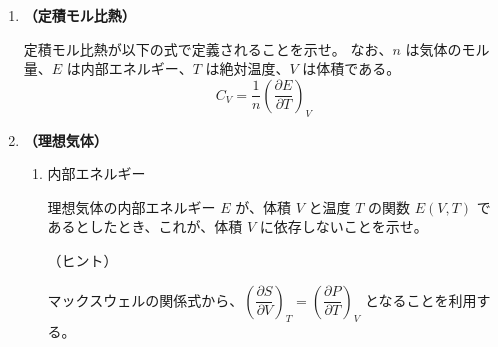 \documentclass[uplatex,dvipdfmx,a4paper,11pt]{jsarticle}
\begin{document}
\begin{enumerate}
\item 
{\bf （定積モル比熱）}

定積モル比熱が以下の式で定義されることを示せ。
なお、$n$ は気体のモル量、$E$ は内部エネルギー、$T$ は絶対温度、$V$ は体積である。
\begin{equation*}
C_V = \dfrac{1}{n} \left( \dfrac{\partial E}{\partial T} \right)_V
\end{equation*}

%
%
%
%
%


\item
{\bf （理想気体）}

\begin{enumerate}
\item
内部エネルギー

理想気体の内部エネルギー $E$ が、体積 $V$ と温度 $T$ の関数 $E(V,T)$ であるとしたとき、これが、体積 $V$ に依存しないことを示せ。

（ヒント）

マックスウェルの関係式から、$\left(\dfrac{\partial S}{\partial V} \right)_T = \left(\dfrac{\partial P}{\partial T} \right)_V$ となることを利用する。


\end{enumerate}
\end{enumerate}
\end{document}
